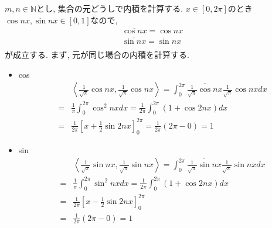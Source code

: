 \documentclass[a4paper,11pt]{jsarticle}
\begin{document}
\section{}
$m, n \in \mathbb{N}$とし, 集合の元どうしで内積を計算する.
$x \in [0, 2\pi]$のとき$\cos{nx}, \sin{nx} \in [0, 1]$なので, 
\begin{eqnarray*}
  \overline{\cos{nx}} = \cos{nx} \\
  \overline{\sin{nx}} = \sin{nx} \\
\end{eqnarray*}
が成立する. まず, 元が同じ場合の内積を計算する.
\begin{itemize}
  \item cos
    \begin{eqnarray*}
      && \left<\frac{1}{\sqrt{\pi}}\cos{nx}, \frac{1}{\sqrt{\pi}}\cos{nx}\right>
      = \int_{0}^{2\pi}{\overline{\frac{1}{\sqrt{\pi}}\cos{nx}}\frac{1}{\sqrt{\pi}}\cos{nx}}dx \\
      &=& \frac{1}{\pi}\int_{0}^{2\pi}{\cos^{2}{nx}}dx
      = \frac{1}{2\pi}\int_{0}^{2\pi}{\left(1 + \cos{2nx}\right)}dx \\
      &=& \frac{1}{2\pi}\left[x + \frac{1}{2}\sin{2nx}\right]_{0}^{2\pi}
      = \frac{1}{2\pi}\left(2\pi - 0\right) = 1
    \end{eqnarray*}
  \item sin
    \begin{eqnarray*}
      && \left<\frac{1}{\sqrt{\pi}}\sin{nx}, \frac{1}{\sqrt{\pi}}\sin{nx}\right>
      = \int_{0}^{2\pi}{\overline{\frac{1}{\sqrt{\pi}}\sin{nx}}\frac{1}{\sqrt{\pi}}\sin{nx}}dx \\
      &=& \frac{1}{\pi}\int_{0}^{2\pi}{\sin^{2}{nx}}dx
      = \frac{1}{2\pi}\int_{0}^{2\pi}{\left(1 + \cos{2nx}\right)}dx \\
      &=& \frac{1}{2\pi}\left[x - \frac{1}{2}\sin{2nx}\right]_{0}^{2\pi} \\
      &=& \frac{1}{2\pi}\left(2\pi - 0\right) = 1
    \end{eqnarray*}
\end{itemize}
\end{document}
